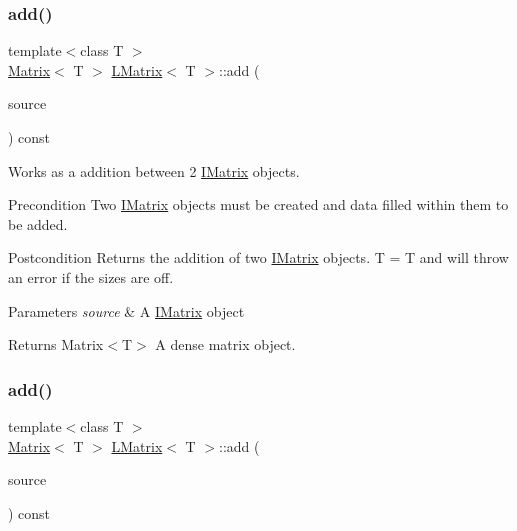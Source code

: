 \subsubsection{\texorpdfstring{add()}{add()}\hspace{0.1cm}{\footnotesize\ttfamily [5/6]}}
{\footnotesize\ttfamily template$<$class T $>$ \\
\mbox{\hyperlink{class_matrix}{Matrix}}$<$ T $>$ \mbox{\hyperlink{class_l_matrix}{L\+Matrix}}$<$ T $>$\+::add (\begin{DoxyParamCaption}\item[{const \mbox{\hyperlink{class_i_matrix}{I\+Matrix}}$<$ \mbox{\hyperlink{class_s_matrix}{S\+Matrix}}$<$ T $>$, T $>$ \&}]{source }\end{DoxyParamCaption}) const}



Works as a addition between 2 \mbox{\hyperlink{class_i_matrix}{I\+Matrix}} objects. 

\begin{DoxyPrecond}{Precondition}
Two \mbox{\hyperlink{class_i_matrix}{I\+Matrix}} objects must be created and data filled within them to be added. 
\end{DoxyPrecond}
\begin{DoxyPostcond}{Postcondition}
Returns the addition of two \mbox{\hyperlink{class_i_matrix}{I\+Matrix}} objects. T = T and will throw an error if the sizes are off.
\end{DoxyPostcond}

\begin{DoxyParams}{Parameters}
{\em source} & A \mbox{\hyperlink{class_i_matrix}{I\+Matrix}} object \\
\hline
\end{DoxyParams}
\begin{DoxyReturn}{Returns}
Matrix$<$\+T$>$ A dense matrix object. 
\end{DoxyReturn}
\mbox{\label{class_l_matrix_a134ae507dfaf35679e0008ad5b6f92f1}} 
\subsubsection{\texorpdfstring{add()}{add()}\hspace{0.1cm}{\footnotesize\ttfamily [6/6]}}
{\footnotesize\ttfamily template$<$class T $>$ \\
\mbox{\hyperlink{class_matrix}{Matrix}}$<$ T $>$ \mbox{\hyperlink{class_l_matrix}{L\+Matrix}}$<$ T $>$\+::add (\begin{DoxyParamCaption}\item[{const \mbox{\hyperlink{class_i_matrix}{I\+Matrix}}$<$ \mbox{\hyperlink{class_d_matrix}{D\+Matrix}}$<$ T $>$, T $>$ \&}]{source }\end{DoxyParamCaption}) const}



